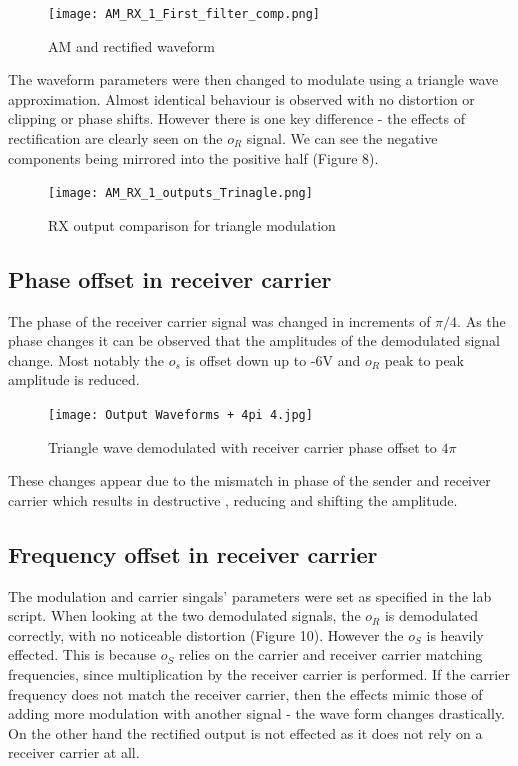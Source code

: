 \documentclass[a4paper]{article}
\begin{document}
\begin{figure}[htbp]
\centering

\texttt{[image: AM\_RX\_1\_First\_filter\_comp.png]}
\caption{AM and rectified waveform}

\end{figure}

\newpage

\noindent The waveform parameters were then changed to modulate using a triangle wave approximation. Almost identical behaviour is observed with no distortion or clipping or phase shifts. However there is one key difference - the effects of rectification are clearly seen on the $o_R$ signal. We can see the negative components being mirrored into the positive half (Figure 8).

\begin{figure}[htbp]
\centering

\texttt{[image: AM\_RX\_1\_outputs\_Trinagle.png]}
\caption{RX output comparison for triangle modulation}

\end{figure}

\newpage



\subsection*{Phase offset in receiver carrier}
The phase of the receiver carrier signal was changed in increments of $\pi/4$. As the phase changes it can be observed that the amplitudes of the demodulated signal change. Most notably the $o_s$ is offset down up to -6V and $o_R$ peak to peak amplitude is reduced.


\begin{figure}[htbp]
\centering

\texttt{[image: Output Waveforms + 4pi 4.jpg]}
\caption{Triangle wave demodulated with receiver carrier phase offset to $4\pi$ }

\end{figure}

\noindent These changes appear due to the mismatch in phase of the sender and receiver carrier which results in destructive , reducing and shifting the amplitude.


\subsection*{Frequency offset in receiver carrier}
The modulation and carrier singals' parameters were set as specified in the lab script. When looking at the two demodulated signals, the $o_R$ is demodulated correctly, with no noticeable distortion (Figure 10). However the $o_S$ is heavily effected. This is because $o_S$ relies on the carrier and receiver carrier matching frequencies, since multiplication by the receiver carrier is performed. If the carrier frequency does not match the receiver carrier, then the effects mimic those of adding more modulation with another signal - the wave form changes drastically. On the other hand the rectified output is not effected as it does not rely on a receiver carrier at all.
\end{document}
